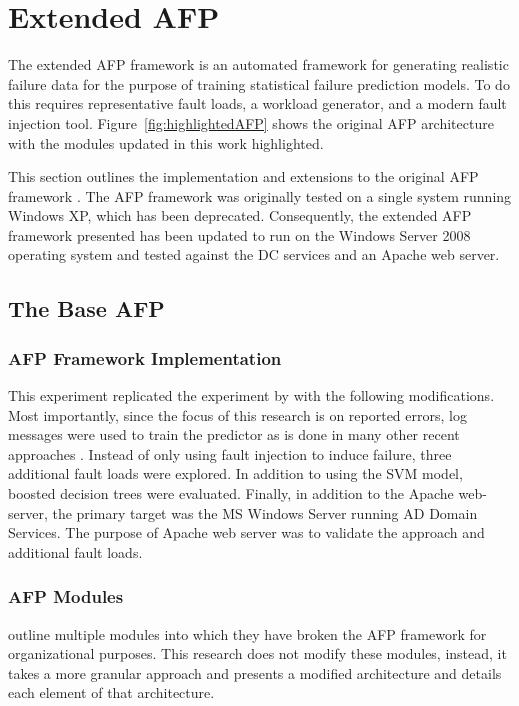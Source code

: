 \section{Extended \acrfull{AFP}} \label{chapter3}
The extended \ac{AFP} framework is an automated framework for generating
realistic failure data for the purpose of training statistical failure
prediction models.  To do this requires representative fault loads, a workload
generator, and a modern fault injection tool.  Figure~\ref{fig:highlightedAFP}
shows the original \ac{AFP} architecture with the modules updated in this work
highlighted.

This section outlines the implementation and extensions to the original
\ac{AFP} framework \citep{irrera2015}.  The \ac{AFP} framework was originally
tested on a single system running Windows XP, which has been deprecated.
Consequently, the extended \ac{AFP} framework presented has been updated to run
on the Windows Server 2008 operating system and tested against the \ac{DC}
services and an Apache web server.

\subsection{The Base \acrfull{AFP}} \label{sec:implementation}
\subsubsection{\acrfull{AFP} Framework Implementation}
This experiment replicated the experiment by \citet{irrera2015} with the
following modifications.  Most importantly, since the focus of this research is
on reported errors, log messages were used to train the predictor as is done in
many other recent approaches
\citep{domeniconi2002,fulp2008,salfner2007,watanabe2014}.  Instead of only
using fault injection to induce failure, three additional fault loads were
explored.  In addition to using the \ac{SVM} model, boosted decision trees were
evaluated.  Finally, in addition to the Apache web-server, the primary target
was the \ac{MS} Windows Server running \ac{AD} Domain Services.  The purpose of
Apache web server was to validate the approach and additional fault loads.

\subsubsection{\acrfull{AFP} Modules}
\citet{irrera2015} outline multiple modules into which they have broken the
\ac{AFP} framework for organizational purposes.  This research does not modify
these modules, instead, it takes a more granular approach and presents a
modified architecture and details each element of that architecture.

